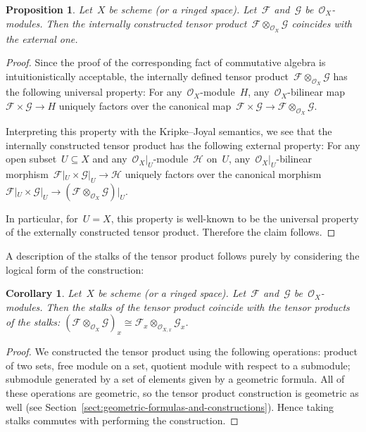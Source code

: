 \documentclass[10pt]{amsart}
\theoremstyle{definition}
\theoremstyle{plain}
\newtheorem{prop}[defn]{Proposition}
\newtheorem{cor}[defn]{Corollary}
\theoremstyle{remark}
\newcommand{\F}{\mathcal{F}}
\renewcommand{\G}{\mathcal{G}}
\renewcommand{\H}{\mathcal{H}}
\renewcommand{\O}{\mathcal{O}}
\newcommand{\?}{\,{:}\,}
\renewcommand{\_}{\mathpunct{.}\,}
\begin{document}
\begin{prop}\label{prop:internal-tensor-product}
Let~$X$ be scheme (or a ringed space). Let~$\F$ and~$\G$
be~$\O_X$-modules. Then the internally constructed tensor product~$\F
\otimes_{\O_X} \G$ coincides with the external one.
\end{prop}
\begin{proof}
Since the proof of the corresponding fact of commutative algebra is
intuitionistically acceptable, the internally defined tensor product~$\F \otimes_{\O_X} \G$
has the following universal property: For any~$\O_X$-module~$H$,
any~$\O_X$-bilinear map~$\F \times \G \to H$ uniquely factors over the
canonical map~$\F \times \G \to \F \otimes_{\O_X} \G$.

Interpreting this property with the Kripke--Joyal semantics, we see that the
internally constructed tensor product has the following external property:
For any open subset~$U \subseteq X$ and any~$\O_X|_U$-module~$\H$ on~$U$,
any~$\O_X|_U$-bilinear morphism~$\F|_U \times \G|_U \to \H$ uniquely factors over the
canonical morphism~$\F|_U \times \G|_U \to (\F \otimes_{\O_X} \G)|_U$.

In particular, for~$U = X$, this property is well-known to be the universal
property of the externally constructed tensor product. Therefore the
claim follows.
\end{proof}

A description of the stalks of the tensor product
follows purely by considering the logical form of the construction:
\begin{cor}Let~$X$ be scheme (or a ringed space). Let~$\F$ and~$\G$
be~$\O_X$-modules. Then the stalks of the tensor product coincide with the
tensor products of the stalks: $(\F \otimes_{\O_X} \G)_x \cong \F_x
\otimes_{\O_{X,x}} \G_x$.\end{cor}
\begin{proof}
We constructed the tensor product using the following operations: product of
two sets, free module on a set, quotient module with respect to a submodule;
submodule generated by a set of elements given by a geometric formula.
All of these operations are geometric, so the tensor product construction is
geometric as well (see Section~\ref{sect:geometric-formulas-and-constructions}). Hence taking stalks commutes with performing the
construction.
\end{proof}
\end{document}

